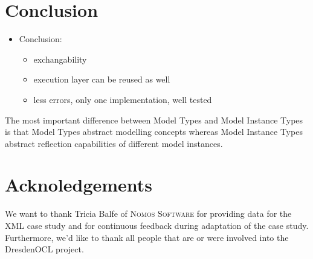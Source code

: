\section{Conclusion}
\label{sec:conclusion}
\begin{itemize}
  \item Conclusion:
  \begin{itemize}
    \item exchangability
    \item execution layer can be reused as well
    \item less errors, only one implementation, well tested
  \end{itemize}  
\end{itemize}

The most important difference between Model Types and Model Instance Types
	is that Model Types abstract modelling concepts whereas Model Instance Types abstract 
	reflection capabilities of different model instances.

\section{Acknoledgements}

We want to thank Tricia Balfe of \textsc{Nomos Software} for providing data for the XML case study and for continuous feedback during adaptation of the case study.
Furthermore, we'd like to thank all people that are or were involved into the DresdenOCL project.